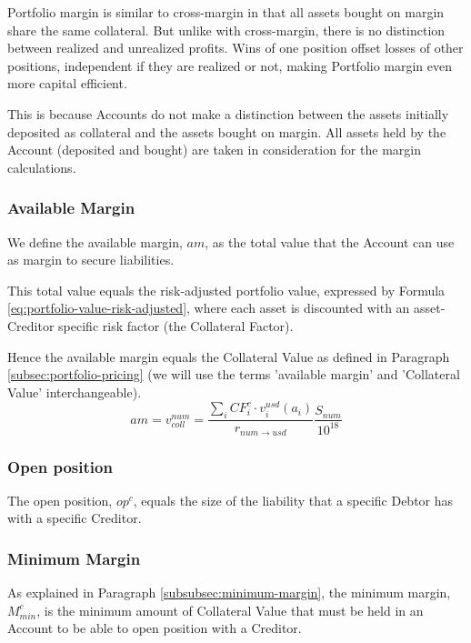 \documentclass[sigconf,nonacm]{acmart}
\begin{document}
Portfolio margin is similar to cross-margin in that all assets bought on margin share the same collateral.
But unlike with cross-margin, there is no distinction between realized and unrealized profits.
Wins of one position offset losses of other positions, independent if they are realized or not,
making Portfolio margin even more capital efficient.

This is because Accounts do not make a distinction between the assets initially deposited as collateral and the assets bought on margin.
All assets held by the Account (deposited and bought) are taken in consideration for the margin calculations.

\subsubsection{Available Margin}
\label{subsubsec:available-margin}
We define the available margin, $am$, as the total value that the Account can use as margin to secure liabilities.

This total value equals the risk-adjusted portfolio value, expressed by Formula \ref{eq:portfolio-value-risk-adjusted},
where each asset is discounted with an asset-Creditor specific risk factor (the Collateral Factor).

Hence the available margin equals the Collateral Value as defined in Paragraph \ref{subsec:portfolio-pricing}
(we will use the terms 'available margin' and 'Collateral Value' interchangeable).
\begin{equation}
    \label{eq:available-margin}
    am = v_{coll}^{num} = \frac{\sum_{i}{CF_{i}^{c} \cdot v^{usd}_{i}(a_{i})}}{r_{num\rightarrow usd}}\frac{S_{num}}{10^{18}}
\end{equation}

\subsubsection{Open position}
The open position, $op^c$, equals the size of the liability that a specific Debtor has with a specific Creditor.

\subsubsection{Minimum Margin}
As explained in Paragraph \ref{subsubsec:minimum-margin}, the minimum margin, $M_{min}^c$, 
is the minimum amount of Collateral Value that must be held in an Account to be able to open position with a Creditor.
\end{document}
